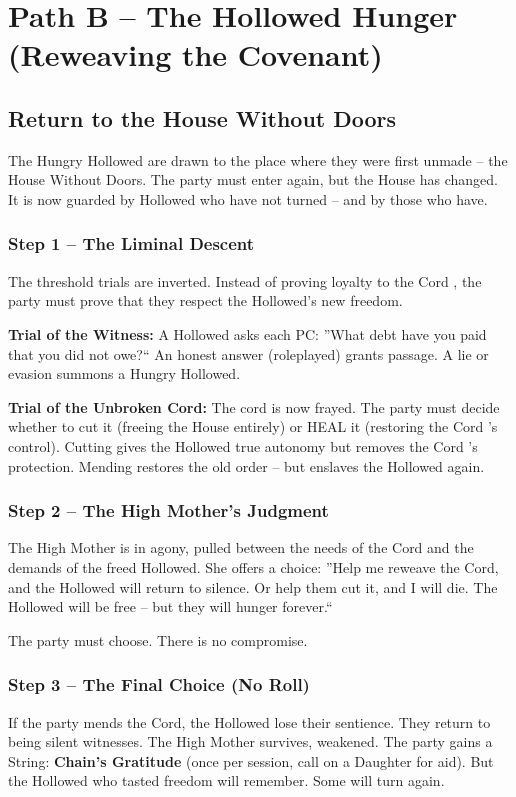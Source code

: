 \documentclass[10pt,twoside]{book}
\begin{document}
\section{Path B -- The Hollowed Hunger (Reweaving the Covenant)}

\subsection{Return to the House Without Doors}
The Hungry Hollowed are drawn to the place where they were first unmade -- the House Without Doors. The party must enter again, but the House has changed. It is now guarded by Hollowed who have not turned -- and by those who have.

\subsubsection{Step 1 -- The Liminal Descent}
The threshold trials are inverted. Instead of proving loyalty to the Cord , the party must prove that they respect the Hollowed's new freedom.

\textbf{Trial of the Witness:} A Hollowed asks each PC: ''What debt have you paid that you did not owe?`` An honest answer (roleplayed) grants passage. A lie or evasion summons a Hungry Hollowed.

\textbf{Trial of the Unbroken Cord:} The cord is now frayed. The party must decide whether to cut it (freeing the House entirely) or HEAL it (restoring the Cord 's control). Cutting gives the Hollowed true autonomy but removes the Cord 's protection. Mending restores the old order -- but enslaves the Hollowed again.

\subsubsection{Step 2 -- The High Mother's Judgment}
The High Mother is in agony, pulled between the needs of the Cord and the demands of the freed Hollowed. She offers a choice: ''Help me reweave the Cord, and the Hollowed will return to silence. Or help them cut it, and I will die. The Hollowed will be free -- but they will hunger forever.``

The party must choose. There is no compromise.

\subsubsection{Step 3 -- The Final Choice (No Roll)}
If the party mends the Cord, the Hollowed lose their sentience. They return to being silent witnesses. The High Mother survives, weakened. The party gains a String: \textbf{Chain's Gratitude} (once per session, call on a Daughter for aid). But the Hollowed who tasted freedom will remember. Some will turn again.
\end{document}
